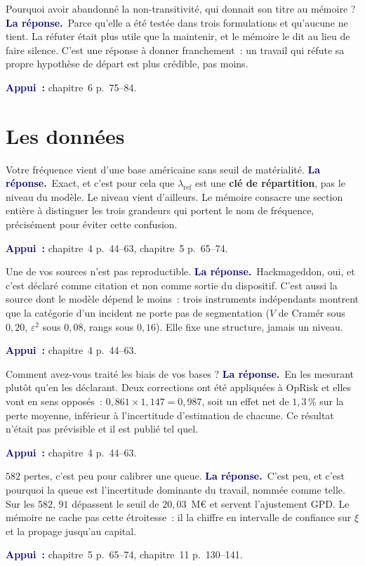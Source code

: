 \documentclass[11pt,a4paper]{article}
\newcommand{\rep}[1]{\smallskip\noindent\textcolor{navy}{\textbf{La réponse.}}\ #1\par}
\newcommand{\appui}[1]{\smallskip\noindent\small\textcolor{navy}{\textbf{Appui~:}} #1\par\normalsize}
\begin{document}
\begin{question}{\og Pourquoi avoir abandonné la non-transitivité, qui donnait son titre au mémoire ?\fg{}}
\rep{Parce qu'elle a été testée dans trois formulations et qu'aucune ne tient. La réfuter était
plus utile que la maintenir, et le mémoire le dit au lieu de faire silence. C'est une réponse à
donner franchement~: un travail qui réfute sa propre hypothèse de départ est plus crédible, pas
moins.}
\appui{chapitre~6 p.~75--84.}
\end{question}

\section{Les données}

\begin{question}{\og Votre fréquence vient d'une base américaine sans seuil de matérialité.\fg{}}
\rep{Exact, et c'est pour cela que $\lambda_{\mathrm{ref}}$ est une \textbf{clé de répartition},
pas le niveau du modèle. Le niveau vient d'ailleurs. Le mémoire consacre une section entière à
distinguer les trois grandeurs qui portent le nom de \og fréquence\fg{}, précisément pour éviter
cette confusion.}
\appui{chapitre~4 p.~44--63, chapitre~5 p.~65--74.}
\end{question}

\begin{question}{\og Une de vos sources n'est pas reproductible.\fg{}}
\rep{Hackmageddon, oui, et c'est déclaré comme citation et non comme sortie du dispositif. C'est
aussi la source dont le modèle dépend le moins~: trois instruments indépendants montrent que la
catégorie d'un incident ne porte pas de segmentation ($V$ de Cramér sous $0{,}20$,
$\varepsilon^2$ sous $0{,}08$, rangs sous $0{,}16$). Elle fixe une structure, jamais un niveau.}
\appui{chapitre~4 p.~44--63.}
\end{question}

\begin{question}{\og Comment avez-vous traité les biais de vos bases ?\fg{}}
\rep{En les mesurant plutôt qu'en les déclarant. Deux corrections ont été appliquées à OpRisk et
elles vont en sens opposés~: $0{,}861\times1{,}147=0{,}987$, soit un effet net de $1{,}3\,\%$ sur
la perte moyenne, inférieur à l'incertitude d'estimation de chacune. Ce résultat n'était pas
prévisible et il est publié tel quel.}
\appui{chapitre~4 p.~44--63.}
\end{question}

\begin{question}{\og $582$ pertes, c'est peu pour calibrer une queue.\fg{}}
\rep{C'est peu, et c'est pourquoi la queue est l'incertitude dominante du travail, nommée comme
telle. Sur les $582$, $91$ dépassent le seuil de $20{,}03$~M\euro{} et servent l'ajustement GPD.
Le mémoire ne cache pas cette étroitesse~: il la chiffre en intervalle de confiance sur $\xi$ et
la propage jusqu'au capital.}
\appui{chapitre~5 p.~65--74, chapitre~11 p.~130--141.}
\end{question}
\end{document}
